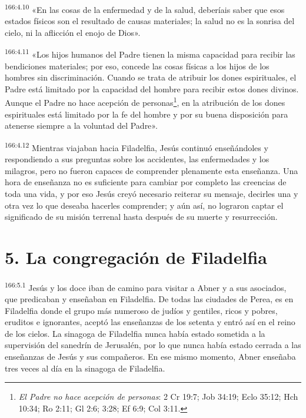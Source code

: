 \par 
\textsuperscript{166:4.10} «En las cosas de la enfermedad y de la salud, deberíais saber que esos estados físicos son el resultado de causas materiales; la salud no es la sonrisa del cielo, ni la aflicción el enojo de Dios».

\par 
\textsuperscript{166:4.11} «Los hijos humanos del Padre tienen la misma capacidad para recibir las bendiciones materiales; por eso, concede las cosas físicas a los hijos de los hombres sin discriminación. Cuando se trata de atribuir los dones espirituales, el Padre está limitado por la capacidad del hombre para recibir estos dones divinos. Aunque el Padre no hace acepción de personas\footnote{\textit{El Padre no hace acepción de personas}: 2 Cr 19:7; Job 34:19; Eclo 35:12; Hch 10:34; Ro 2:11; Gl 2:6; 3:28; Ef 6:9; Col 3:11.}, en la atribución de los dones espirituales está limitado por la fe del hombre y por su buena disposición para atenerse siempre a la voluntad del Padre».

\par 
\textsuperscript{166:4.12} Mientras viajaban hacia Filadelfia, Jesús continuó enseñándoles y respondiendo a sus preguntas sobre los accidentes, las enfermedades y los milagros, pero no fueron capaces de comprender plenamente esta enseñanza. Una hora de enseñanza no es suficiente para cambiar por completo las creencias de toda una vida, y por eso Jesús creyó necesario reiterar su mensaje, decirles una y otra vez lo que deseaba hacerles comprender; y aún así, no lograron captar el significado de su misión terrenal hasta después de su muerte y resurrección.

\section*{5. La congregación de Filadelfia}
\par 
\textsuperscript{166:5.1} Jesús y los doce iban de camino para visitar a Abner y a sus asociados, que predicaban y enseñaban en Filadelfia. De todas las ciudades de Perea, es en Filadelfia donde el grupo más numeroso de judíos y gentiles, ricos y pobres, eruditos e ignorantes, aceptó las enseñanzas de los setenta y entró así en el reino de los cielos. La sinagoga de Filadelfia nunca había estado sometida a la supervisión del sanedrín de Jerusalén, por lo que nunca había estado cerrada a las enseñanzas de Jesús y sus compañeros. En ese mismo momento, Abner enseñaba tres veces al día en la sinagoga de Filadelfia.

